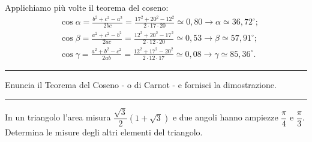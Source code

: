 \documentclass[12pt, a4paper]{exam}
\begin{document}
\begin{questions}
\begin{tikzpicture}
    \end{tikzpicture}
      \begin{solution}
        Applichiamo più volte il teorema del coseno:
$$
\begin{aligned}
& \cos \alpha=\frac{b^2+c^2-a^2}{2 b c}=\frac{17^2+20^2-12^2}{2 \cdot 17 \cdot 20} \simeq 0,80 \rightarrow \alpha \simeq 36,72^{\circ} ; \\
& \cos \beta=\frac{a^2+c^2-b^2}{2 a c}=\frac{12^2+20^2-17^2}{2 \cdot 12 \cdot 20} \simeq 0,53 \rightarrow \beta \simeq 57,91^{\circ} ; \\
& \cos \gamma=\frac{a^2+b^2-c^2}{2 a b}=\frac{12^2+17^2-20^2}{2 \cdot 12 \cdot 17} \simeq 0,08 \rightarrow \gamma \simeq 85,36^{\circ} .
\end{aligned}
$$
      \end{solution}
  \hrule

  \vspace{10pt}

\addpoints
  \question[4] Enuncia il Teorema del Coseno - o di Carnot - e fornisci la dimostrazione.

\fillwithdottedlines{0.5in}
    \begin{center}
  \end{center}
  \vspace{10pt}

  \hrule


\addpoints
\question[4] In un triangolo l'area misura $\dfrac{\sqrt{3}}{2}(1+ \sqrt{3})$ e due angoli hanno ampiezze $\dfrac{\pi}{4}$ e $\dfrac{\pi}{3}$.\\
Determina le misure degli altri elementi del triangolo.
    \begin{center}
  \end{center}
  \vspace{10pt}
  \newpage


\end{questions}
\end{document}

